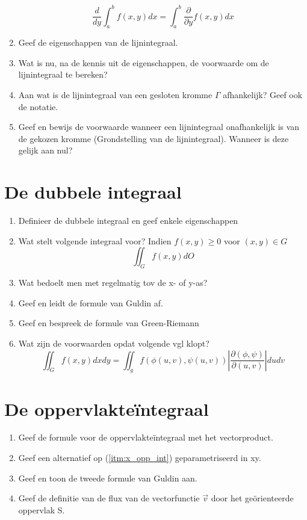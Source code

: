 \documentclass[a4paper,12pt]{article}
\begin{document}
\begin{enumerate}
            $$ \frac{d}{dy}\int_a^b f(x,y)dx = \int_a^b \frac{\partial}{\partial y}f(x, y)dx $$
        \item Geef de eigenschappen van de lijnintegraal.
        \item Wat is nu, na de kennis uit de eigenschappen, de voorwaarde om de lijnintegraal te bereken?
        \item Aan wat is de lijnintegraal van een gesloten kromme $\Gamma$ afhankelijk? Geef ook de notatie.
        \item Geef en bewijs de voorwaarde wanneer een lijnintegraal onafhankelijk is van de gekozen kromme (Grondstelling van de lijnintegraal). Wanneer is deze gelijk aan nul?
    \end{enumerate}

    
    \section{De dubbele integraal}
    \begin{enumerate}
        \item Definieer de dubbele integraal en geef enkele eigenschappen
        \item Wat stelt volgende integraal voor? Indien $f(x,y) \geq 0$ voor $(x,y) \in G$
            $$ \iint_G f(x,y)dO $$
        \item Wat bedoelt men met regelmatig tov de x- of y-as?
        \item Geef en leidt de formule van Guldin af.
        \item Geef en bespreek de formule van Green-Riemann
        \item Wat zijn de voorwaarden opdat volgende vgl klopt?
            $$ \iint_G f(x,y)dxdy = \iint_g f(\phi(u,v), \psi(u,v)) \left|\frac{\partial(\phi, \psi)}{\partial(u,v)}\right| dudv $$
    \end{enumerate}

    \section{De oppervlakte\"integraal}
    \begin{enumerate}
        \item \label{itm:x_opp_int} Geef de formule voor de oppervlakte\"integraal met het vectorproduct.
        \item Geef een alternatief op (\ref{itm:x_opp_int}) geparametriseerd in xy.
        \item Geef en toon de tweede formule van Guldin aan.
        \item Geef de definitie van de flux van de vectorfunctie $\vec{v}$ door het ge\"orienteerde oppervlak S.
    \end{enumerate}
    
\end{document}
